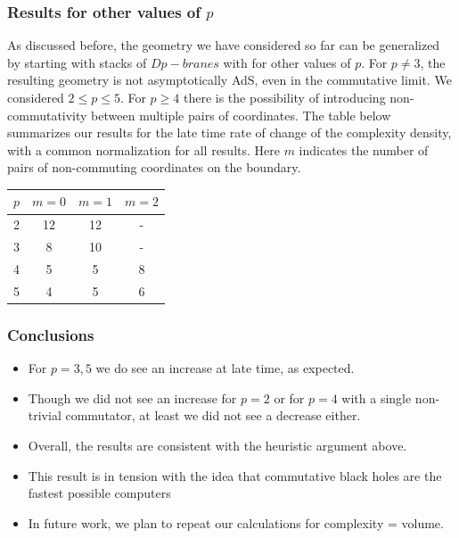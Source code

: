 \documentclass[8pt,aspectratio=169]{beamer}
\begin{document}
\begin{frame}
\frametitle{Results for other values of $p$}

As discussed before, the geometry we have considered so far can be generalized by starting with stacks of $Dp-branes$ with for other values of $p$. For $p\neq 3$, the resulting geometry is not asymptotically AdS, even in the commutative limit. We considered $2\leq p \leq 5$. For $p\geq 4$ there is the possibility of introducing non-commutativity between multiple pairs of coordinates. The table below summarizes our results for the late time rate of change of the complexity density, with a common normalization for all results. Here $m$ indicates the number of pairs of non-commuting coordinates on the boundary.   

\begin{table}
    \centering
    \begin{tabular}{l | c  c  c }
        $p$ & $m=0$ & $m=1$ & $m=2$ \\
        \hline
        2 & 12 & 12 & - \\
        3 & 8 & 10 & - \\
        4 & 5 & 5 & 8 \\
        5 & 4 & 5 & 6 \\
    \end{tabular}
\end{table}

\end{frame}

\begin{frame}
\frametitle{Conclusions}

\begin{itemize}

\item For $p=3,5$ we do see an increase at late time, as expected.

\item Though we did not see an increase for $p=2$ or for $p=4$ with a single non-trivial commutator, at least we did not see a decrease either.

\item Overall, the results are consistent with the heuristic argument above.

\item This result is in tension with the idea that commutative black holes are the fastest possible computers

\item In future work, we plan to repeat our calculations for complexity = volume.

\end{itemize}

\end{frame}
\end{document}
